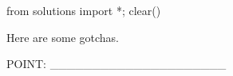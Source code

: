\begin{python0}
from solutions import *; clear()
\end{python0}

Here are some gotchas.




POINT: \_\_\_\_\_\_\_\_\_\_\_\_\_\_\_\_\_\_\_\_\_


